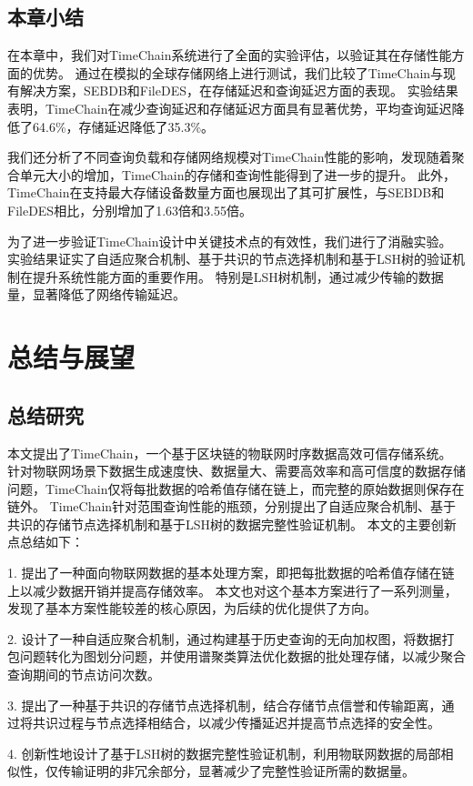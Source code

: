 \section{本章小结}
在本章中，我们对TimeChain系统进行了全面的实验评估，以验证其在存储性能方面的优势。
通过在模拟的全球存储网络上进行测试，我们比较了TimeChain与现有解决方案，SEBDB和FileDES，在存储延迟和查询延迟方面的表现。
实验结果表明，TimeChain在减少查询延迟和存储延迟方面具有显著优势，平均查询延迟降低了64.6\%，存储延迟降低了35.3\%。

我们还分析了不同查询负载和存储网络规模对TimeChain性能的影响，发现随着聚合单元大小的增加，TimeChain的存储和查询性能得到了进一步的提升。
此外，TimeChain在支持最大存储设备数量方面也展现出了其可扩展性，与SEBDB和FileDES相比，分别增加了1.63倍和3.55倍。

为了进一步验证TimeChain设计中关键技术点的有效性，我们进行了消融实验。
实验结果证实了自适应聚合机制、基于共识的节点选择机制和基于LSH树的验证机制在提升系统性能方面的重要作用。
特别是LSH树机制，通过减少传输的数据量，显著降低了网络传输延迟。

\chapter{总结与展望}

\section{总结研究}
本文提出了TimeChain，一个基于区块链的物联网时序数据高效可信存储系统。
针对物联网场景下数据生成速度快、数据量大、需要高效率和高可信度的数据存储问题，TimeChain仅将每批数据的哈希值存储在链上，而完整的原始数据则保存在链外。
TimeChain针对范围查询性能的瓶颈，分别提出了自适应聚合机制、基于共识的存储节点选择机制和基于LSH树的数据完整性验证机制。
本文的主要创新点总结如下：

1. 提出了一种面向物联网数据的基本处理方案，即把每批数据的哈希值存储在链上以减少数据开销并提高存储效率。
本文也对这个基本方案进行了一系列测量，发现了基本方案性能较差的核心原因，为后续的优化提供了方向。

2. 设计了一种自适应聚合机制，通过构建基于历史查询的无向加权图，将数据打包问题转化为图划分问题，并使用谱聚类算法优化数据的批处理存储，以减少聚合查询期间的节点访问次数。

3. 提出了一种基于共识的存储节点选择机制，结合存储节点信誉和传输距离，通过将共识过程与节点选择相结合，以减少传播延迟并提高节点选择的安全性。

4. 创新性地设计了基于LSH树的数据完整性验证机制，利用物联网数据的局部相似性，仅传输证明的非冗余部分，显著减少了完整性验证所需的数据量。

